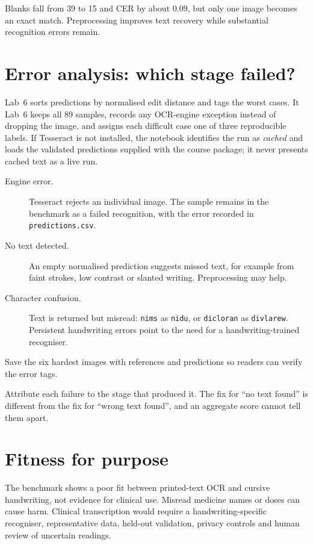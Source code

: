 Blanks fall from 39 to 15 and CER by about $0.09$, but only one image becomes an exact match. Preprocessing improves text recovery while substantial recognition errors remain.

\section{Error analysis: which stage failed?}

Lab~6 sorts predictions by normalised edit distance and tags the worst cases. It
Lab~6 keeps all 89 samples, records any OCR-engine exception instead of dropping the image,
and assigns each difficult case one of three reproducible labels. If Tesseract is not
installed, the notebook identifies the run as \emph{cached} and loads the validated
predictions supplied with the course package; it never presents cached text as a live run.

\begin{description}
  \item[Engine error.] Tesseract rejects an individual image. The sample remains in the benchmark as a failed recognition, with the error recorded in \texttt{predictions.csv}.
  \item[No text detected.] An empty normalised prediction suggests missed text, for example from faint strokes, low contrast or slanted writing. Preprocessing may help.
  \item[Character confusion.] Text is returned but misread: \texttt{nims} as \texttt{nidu}, or \texttt{dicloran} as \texttt{divlarew}. Persistent handwriting errors point to the need for a handwriting-trained recogniser.
\end{description}

Save the six hardest images with references and predictions so readers can verify the error tags.

\begin{keyidea}
Attribute each failure to the stage that produced it. The fix for ``no text found'' is different from the fix for ``wrong text found'', and an aggregate score cannot tell them apart.
\end{keyidea}

\section{Fitness for purpose}

The benchmark shows a poor fit between printed-text OCR and cursive handwriting, not evidence for clinical use. Misread medicine names or doses can cause harm. Clinical transcription would require a handwriting-specific recogniser, representative data, held-out validation, privacy controls and human review of uncertain readings.

